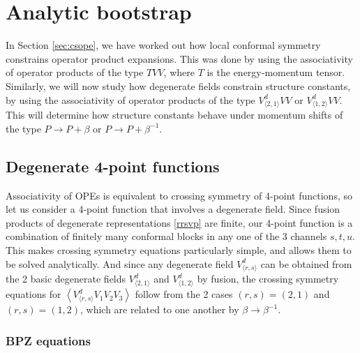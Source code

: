 \documentclass[12pt, a4paper]{article}
\begin{document}
\section{Analytic bootstrap}\label{sec:ab}

In Section \ref{sec:csope}, we have worked out how local conformal symmetry constrains operator product expansions. This was done by using the associativity of operator products of the type $TVV$, where $T$ is the energy-momentum tensor. Similarly, we will now study how degenerate fields constrain structure constants, by using the associativity of 
operator products of the type $V^d_{\langle 2,1\rangle}VV$ or $V^d_{\langle 1,2\rangle}VV$.  
This will determine how structure constants behave under momentum shifts of the type $P\to P+ \beta$ or $P\to P+ \beta^{-1}$. 

\subsection{Degenerate 4-point functions}

Associativity of OPEs is equivalent to crossing symmetry of 4-point functions, so let us consider a 4-point function that involves a degenerate field. Since fusion products of degenerate representations \eqref{rrsvp} are finite, our 4-point function is a combination of finitely many conformal blocks in any one of the 3 channels $s,t,u$. This makes crossing symmetry equations particularly simple, and allows them to be solved analytically. 
And since any degenerate field $V^d_{\langle r,s\rangle}$ can be obtained from the 2 basic degenerate fields $V^d_{\langle 2,1\rangle}$ and $V^d_{\langle 1,2\rangle}$ by fusion, the crossing symmetry equations for $\left<V^d_{\langle r,s\rangle}V_1V_2V_3\right>$ follow from the 2 cases $(r,s)=(2,1)$ and $(r,s)=(1,2)$, which are related to one another by $\beta\to \beta^{-1}$.  

\subsubsection{BPZ equations}
\end{document}
